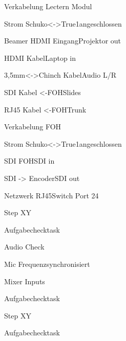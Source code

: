 \begin{checklist}{Verkabelung Lectern Modul}
  \item{Strom Schuko<->True1}{angeschlossen}
  \item{Beamer HDMI Eingang}{Projektor out}
  \item{HDMI Kabel}{Laptop in}
  \item{3,5mm<->Chinch Kabel}{Audio L/R}
  \item{SDI Kabel <-FOH}{Slides}
  \item{RJ45 Kabel <-FOH}{Trunk}
\end{checklist}

\begin{checklist}{Verkabelung FOH}
  \item{Strom Schuko<->True1}{angeschlossen}
  \item{SDI FOH}{SDI in}
  \item{SDI -> Encoder}{SDI out}
  \item{Netzwerk RJ45}{Switch Port 24}
\end{checklist}

\begin{checklist}{Step XY}
  \item{Aufgabe}{checktask}
\end{checklist}

\begin{checklist}{Audio Check}
  \item{Mic Frequenz}{synchronisiert}
  \item{Mixer Inputs}{}
  \item{Aufgabe}{checktask}
\end{checklist}

\begin{checklist}{Step XY}
  \item{Aufgabe}{checktask}
\end{checklist}

